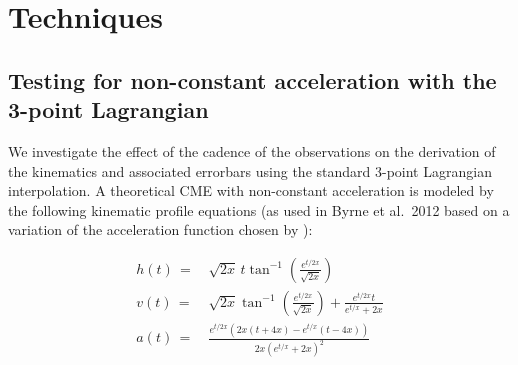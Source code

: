 \documentclass[preprint2]{aastex}
\begin{document}
\section{Techniques}

\subsection{Testing for non-constant acceleration with the 3-point Lagrangian}


We investigate the effect of the cadence of the observations on the derivation of the kinematics and associated errorbars using the standard 3-point Lagrangian interpolation. A theoretical CME with non-constant acceleration is modeled by the following kinematic profile equations (as used in Byrne et al.~2012 based on a variation of the acceleration function chosen by \citealt{2003ApJ...588L..53G}):

\begin{eqnarray}
h(t)\,=&\,\sqrt{2x}\,t\tan^{-1}\left(\frac{e^{t/2x}}{\sqrt{2x}}\right) \\
v(t)\,=&\,\sqrt{2x}\tan^{-1}\left(\frac{e^{t/2x}}{\sqrt{2x}}\right)+\frac{e^{t/2x}t}{e^{t/x}+2x} \\
a(t)\,=&\,\frac{e^{t/2x}\left(2x\left(t+4x\right)-e^{t/x}\left(t-4x\right)\right)}{2x\left(e^{t/x}+2x\right)^2}
\end{eqnarray}
\end{document}
